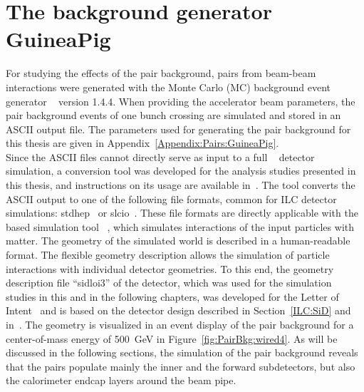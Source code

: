 \section{The background generator GuineaPig}
\label{PairBkg:GuineaPig}
For studying the effects of the pair background, \positron\electron pairs from beam-beam interactions were generated with the Monte Carlo (MC) background event generator \guineapig~\cite{Schulte:1997nga} version 1.4.4. 
When providing the accelerator beam parameters, the pair background events of one bunch crossing are simulated and stored in an ASCII output file.
The parameters used for generating the pair background for this thesis are given in Appendix~\ref{Appendix:Pairs:GuineaPig}. 
\\Since the ASCII files cannot directly serve as input to a full \geant~\cite{geant_ref,geant_ref2} detector simulation, a conversion tool was developed for the analysis studies presented in this thesis, and instructions on its usage are available in~\cite{Confluence}. 
The tool converts the ASCII output to one of the following file formats, common for ILC detector simulations: stdhep~\cite{stdhep} or slcio~\cite{LCIO}.
These file formats are directly applicable with the \geant based simulation tool \slic~\cite{Graf:2006ei}, which simulates interactions of the input particles with matter.
The geometry of the simulated world is described in a human-readable format.
The flexible geometry description allows the simulation of particle interactions with individual detector geometries.
To this end, the geometry description file ``sidloi3'' of the \sid detector, which was used for the simulation studies in this and in the following chapters, was developed for the \sid Letter of Intent~\cite{LoI} and is based on the detector design described in Section~\ref{ILC:SiD} and in~\cite[p. 69 ff]{TDR4}.
The \sid geometry is visualized in an event display of the pair background for a center-of-mass energy of \SI{500}{\GeV} in Figure~\ref{fig:PairBkg:wired4}.
As will be discussed in the following sections, the simulation of the pair background reveals that the pairs populate mainly the inner and the forward \sid subdetectors, but also the calorimeter endcap layers around the beam pipe.
